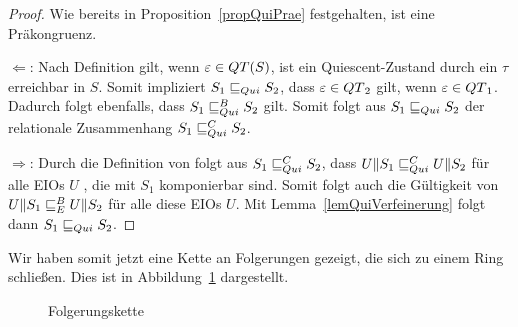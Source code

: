 \begin{proof}
  Wie bereits in Proposition~\ref{propQuiPrae} festgehalten, ist \QRel{} eine
  Präkongruenz.

  \glqq{}$\Leftarrow$\grqq{}: Nach Definition gilt, wenn
  $\varepsilon\in QT{}(S)$, ist ein Quiescent-Zustand durch ein $\tau$
  erreichbar in $S$. Somit impliziert $S_1\sqsubseteq _{Qui} S_2$, dass
  $\varepsilon\in QT{}_2$ gilt, wenn $ \varepsilon\in QT{}_1$. Dadurch folgt
  ebenfalls, dass $S_1\sqsubseteq _{Qui}^B S_2$ gilt. Somit folgt aus $S_1\sqsubseteq _{Qui} S_2$ der
  relationale Zusammenhang $S_1\sqsubseteq _{Qui}^C S_2$.

  \glqq{}$\Rightarrow$\grqq{}: Durch die Definition von \QCRel{} folgt aus
  $S_1\sqsubseteq _{Qui}^C{} S_2$, dass $U\|S_1\sqsubseteq _{Qui}^C U\|S_2$ für alle EIOs $U$ , die mit
  $S_1$ komponierbar sind. Somit folgt auch die Gültigkeit von $U\|S_1\sqsubseteq _E^B
  U\|S_2$ für alle diese EIOs $U$. Mit Lemma~\ref{lemQuiVerfeinerung} folgt
  dann $S_1\sqsubseteq _{Qui}{} S_2$.
\end{proof}

Wir haben somit jetzt eine Kette an Folgerungen gezeigt, die sich zu einem Ring
schließen. Dies ist in Abbildung~\ref{FolgerungsketteQui} dargestellt.

\begin{figure}[h!tbp]
  \begin{center}
    \caption{Folgerungskette}
    \label{FolgerungsketteQui}
  \end{center}
\end{figure}

